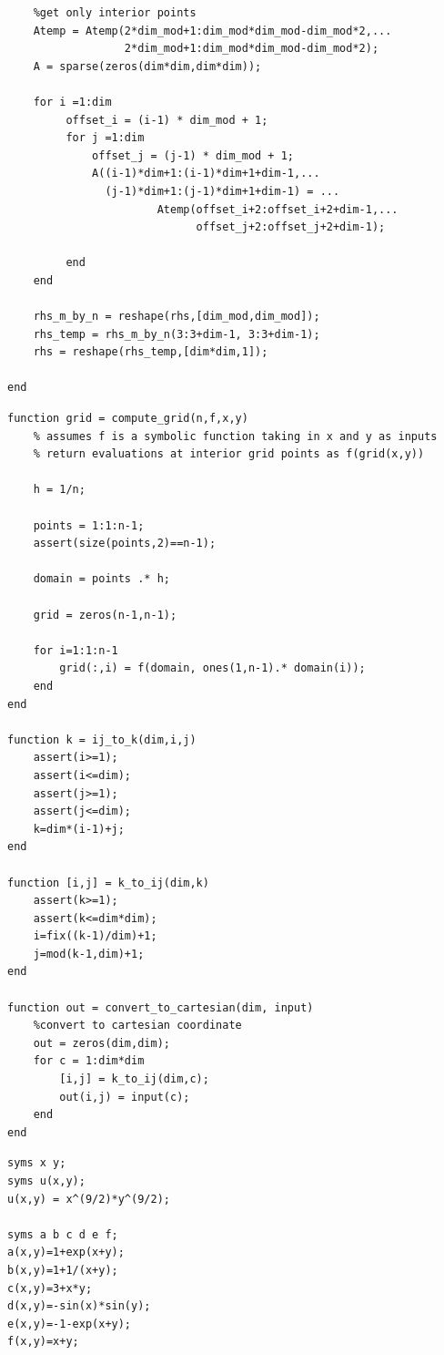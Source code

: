 \documentclass[12pt,letter]{article}
\begin{document}
\begin{enumerate}
\begin{enumerate}
\begin{verbatim}
    %get only interior points
    Atemp = Atemp(2*dim_mod+1:dim_mod*dim_mod-dim_mod*2,...
                  2*dim_mod+1:dim_mod*dim_mod-dim_mod*2);
    A = sparse(zeros(dim*dim,dim*dim));
    
    for i =1:dim
         offset_i = (i-1) * dim_mod + 1;
         for j =1:dim
             offset_j = (j-1) * dim_mod + 1;
             A((i-1)*dim+1:(i-1)*dim+1+dim-1,...
               (j-1)*dim+1:(j-1)*dim+1+dim-1) = ...
                       Atemp(offset_i+2:offset_i+2+dim-1,...
                             offset_j+2:offset_j+2+dim-1);
            
         end
    end
    
    rhs_m_by_n = reshape(rhs,[dim_mod,dim_mod]);
    rhs_temp = rhs_m_by_n(3:3+dim-1, 3:3+dim-1);
    rhs = reshape(rhs_temp,[dim*dim,1]);

end
\end{verbatim}

\pagebreak

\begin{verbatim}
function grid = compute_grid(n,f,x,y)
    % assumes f is a symbolic function taking in x and y as inputs
    % return evaluations at interior grid points as f(grid(x,y))

    h = 1/n;

    points = 1:1:n-1;
    assert(size(points,2)==n-1);

    domain = points .* h;

    grid = zeros(n-1,n-1);

    for i=1:1:n-1
        grid(:,i) = f(domain, ones(1,n-1).* domain(i));
    end
end

function k = ij_to_k(dim,i,j)
    assert(i>=1);
    assert(i<=dim);
    assert(j>=1);
    assert(j<=dim);
    k=dim*(i-1)+j;
end

function [i,j] = k_to_ij(dim,k)
    assert(k>=1);
    assert(k<=dim*dim);
    i=fix((k-1)/dim)+1;
    j=mod(k-1,dim)+1;
end

function out = convert_to_cartesian(dim, input)
    %convert to cartesian coordinate
    out = zeros(dim,dim);
    for c = 1:dim*dim
        [i,j] = k_to_ij(dim,c);
        out(i,j) = input(c);
    end
end
\end{verbatim}

\pagebreak
\begin{verbatim}
syms x y;
syms u(x,y);
u(x,y) = x^(9/2)*y^(9/2);

syms a b c d e f;
a(x,y)=1+exp(x+y);
b(x,y)=1+1/(x+y);
c(x,y)=3+x*y;
d(x,y)=-sin(x)*sin(y);
e(x,y)=-1-exp(x+y);
f(x,y)=x+y;


\end{verbatim}
\end{enumerate}
\end{enumerate}
\end{document}

